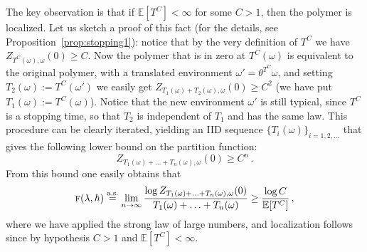 \documentclass[reqno,11pt]{amsart}
\numberwithin{equation}{section}
\newcommand{\bbE}{{\ensuremath{\mathbb E}} }
\newcommand{\go}{\omega}
\newcommand{\gl}{\lambda}
\newcommand{\tf}{\textsc{f}}
\begin{document}
The key observation is that if $\bbE[T^C] < \infty$ for some $C>1$, then the polymer is localized. Let us sketch a proof of this fact (for the details, see Proposition~\ref{prop:stopping1}): notice that by the very definition of $T^C$ we have $Z_{T^C(\go),\go}(0) \ge C$. Now the polymer that is in zero at $T^C(\go)$ is equivalent to the original polymer, with a translated environment $\go'=\theta^{T^C} \go$, and setting $T_2(\go) := T^C (\go')$ we easily get $Z_{T_1(\go)+T_2(\go),\go}(0) \ge C^2$ (we have put $T_1(\go):=T^C(\go)$). Notice that the new environment $\go'$ is still typical, since $T^C$ is a stopping time, so that $T_2$ is independent of $T_1$ and has the same law. This procedure can be clearly iterated, yielding an IID sequence $\{T_i(\go)\}_{i=1,2,\ldots}$ that gives the following lower bound on the partition function:
\begin{equation} \label{eq:lowbound}
Z_{T_1(\go)+\ldots +T_n(\go),\go}(0) \ge  C^n\,.
\end{equation}
From this bound one easily obtains that
\begin{equation}
\label{eq:forappB}
\tf(\gl,h) \stackrel{\text{a.s.}}{= } \lim_{n\to\infty} \frac{\log Z_{T_1(\go)+\ldots +T_n(\go),\go}(0)}{T_1(\go)+\ldots +T_n(\go)} \ge \frac{\log C}{\bbE[T^C]}\,,
\end{equation}
where we have applied the strong law of large numbers, and localization follows since by hypothesis $C>1$ and $\bbE[T^C]<\infty$.

\medskip
\end{document}
